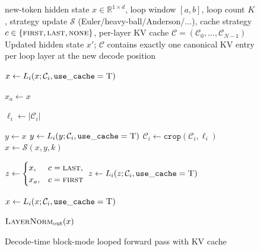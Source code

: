 \begin{figure}[t]
\centering
\begin{algorithm}[H]
\caption{Decode-time block-mode looped forward pass with KV cache}
\label{alg:decode-loop-detailed}
\begin{algorithmic}[1]
\Require new-token hidden state $x \in \mathbb{R}^{1 \times d}$, loop window $[a,b]$, loop count $K$, strategy update $\mathcal{S}$ (Euler/heavy-ball/Anderson/$\ldots$), cache strategy $c \in \{\textsc{first},\textsc{last},\textsc{none}\}$, per-layer KV cache $\mathcal{C} = (\mathcal{C}_0,\ldots,\mathcal{C}_{N-1})$
\Ensure Updated hidden state $x'$; $\mathcal{C}$ contains exactly one canonical KV entry per loop layer at the new decode position

 
    \State $x \gets L_i(x;\mathcal{C}_i,\mathtt{use\_cache}=\textsc{T})$
\EndFor

\State $x_a \gets x$ 

 
    \State $\ell_i \gets |\mathcal{C}_i|$
\EndFor

 
    \State $y \gets x$ 
     
        \State $y \gets L_i(y;\mathcal{C}_i,\mathtt{use\_cache}=\textsc{T})$ 
    \EndFor
     
        \State $\mathcal{C}_i \gets \mathtt{crop}(\mathcal{C}_i,\ell_i)$ 
    \EndFor
    \State $x \gets \mathcal{S}(x,y,k)$ 
\EndFor

 
    \State $z \gets \begin{cases}
        x, & c=\textsc{last},\\
        x_a, & c=\textsc{first}
    \end{cases}$
        \State $z \gets L_i(z;\mathcal{C}_i,\mathtt{use\_cache}=\textsc{T})$ 
    \EndFor
\EndIf

 
    \State $x \gets L_i(x;\mathcal{C}_i,\mathtt{use\_cache}=\textsc{T})$
\EndFor

\State \Return $\textsc{LayerNorm}_{\text{out}}(x)$
\end{algorithmic}
\end{algorithm}
\end{figure}

